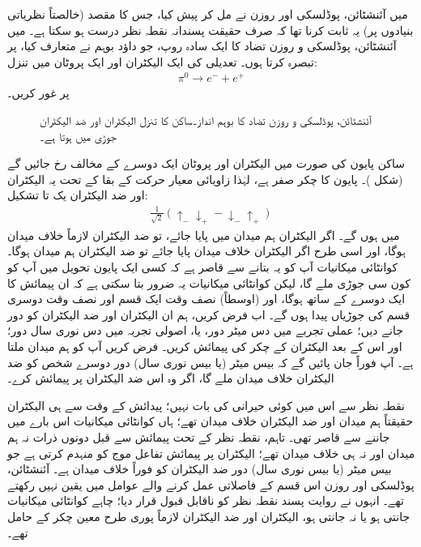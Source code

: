 میں آئنشٹائن، پوڈلسکی اور روزن نے مل کر  پیش کیا، جس کا مقصد (خالصتاً نظریاتی بنیادوں پر) یہ ثابت کرنا تھا کہ صرف حقیقت پسندانہ نقطہ نظر درست ہو سکتا ہے۔ میں آئنشٹائن، پوڈلسکی و روزن تضاد کا ایک سادہ روپ، جو داؤد بوہم نے متعارف کیا، پر تبصرہ کرتا ہوں۔ تعدیلی  کی ایک الیکٹران اور ایک پروٹان میں تنزل:
\begin{align*}
	\pi^0\to e^{-}+e^{+}
\end{align*}
 پر غور کریں۔
\begin{figure}
\centering
{}
\caption{آئنشٹائن، پوڈلسکی و روزن تضاد کا بوہم انداز۔ساکن  کا تنزل الیکٹران اور ضد الیکٹران جوڑی میں ہوتا ہے۔}
\label{شکل_بکھراو_بوہم_تنزل}
\end{figure}
%
ساکن پایون کی صورت میں الیکٹران اور پروٹان ایک دوسرے کے مخالف رخ جائیں گے (شکل )۔ پایون کا چکر صفر ہے، لہٰذا زاویائی معیار حرکت کے بقا کے تحت یہ الیکٹران اور ضد الیکٹران یک تا تشکیل:
\begin{align}\label{مساوات_پس_ہمبستہ}
	\frac{1}{\sqrt{2}}(\uparrow_{-}\downarrow_{+}-\downarrow_{-}\uparrow_{+})
\end{align}
 میں ہوں گے۔ اگر الیکٹران ہم میدان میں پایا جائے، تو ضد الیکٹران لازماً خلاف میدان ہوگا، اور اسی طرح اگر الیکٹران خلاف میدان پایا جائے تو ضد الیکٹران ہم میدان ہوگا۔ کوانٹائی میکانیات آپ کو یہ بتانے سے قاصر ہے کہ کسی ایک پایون تحویل میں آپ کو کون سی جوڑی ملے گا، لیکن کوانٹائی میکانیات یہ ضرور بتا سکتی ہے کہ ان پیمائش کا ایک دوسرے کے ساتھ  ہوگا، اور (اوسطاً) نصف وقت ایک قسم اور نصف وقت دوسری قسم کی جوڑیاں پیدا ہوں گے۔ اب فرض کریں، ہم ان الیکٹران اور ضد الیکٹران کو دور جانے دیں؛ عملی تجربے میں دس میٹر دور، یا، اصولی تجربہ میں دس نوری سال دور؛ اور اس کے بعد الیکٹران کے چکر کی پیمائش کریں۔ فرض کریں آپ کو ہم میدان ملتا ہے۔ آپ فوراً جان پائیں گے کہ بیس میٹر (یا بیس نوری سال) دور دوسرے شخص کو ضد الیکٹران خلاف میدان ملے گا، اگر وہ اس ضد الیکٹران پر پیمائش کرے۔
 
 نقطہ نظر سے اس میں کوئی حیرانی کی بات نہیں؛ پیدائش کے وقت سے ہی الیکٹران حقیقتاً ہم میدان اور ضد الیکٹران خلاف میدان تھے؛ ہاں کوانٹائی میکانیات اس بارے میں جاننے سے قاصر تھی۔ تاہم،  نقطہ نظر کے تحت پیمائش سے قبل دونوں ذرات نہ ہم میدان اور نہ ہی خلاف میدان تھے؛ الیکٹران پر پیمائش تفاعل موج کو منہدم کرتی ہے جو بیس میٹر (یا بیس نوری سال) دور ضد الیکٹران کو فوراً خلاف میدان  ہے۔ آئنشٹائن، پوڈلسکی اور روزن اس قسم کے فاصلاتی عمل کرنے والے عوامل میں یقین نہیں رکھتے تھے۔ انہوں نے روایت پسند نقطہ نظر کو ناقابل قبول قرار دیا؛ چاہے کوانٹائی میکانیات جانتی ہو یا نہ جانتی ہو، الیکٹران اور ضد الیکٹران لازماً پوری طرح معین چکر کے حامل تھے۔ 

